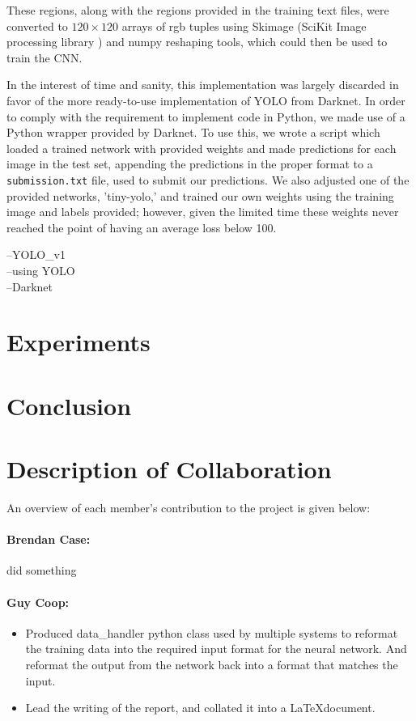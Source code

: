 \documentclass[10pt]{article}
\begin{document}
These regions, along with the regions provided in the training text files, were converted to $120\times 120$ arrays of rgb tuples using Skimage (SciKit Image processing library \cite{skimage}) and numpy reshaping tools, which could then be used to train the CNN.

In the interest of time and sanity, this implementation was largely discarded in favor of the more ready-to-use implementation of YOLO from Darknet. In order to comply with the requirement to implement code in Python, we made use of a Python wrapper provided by Darknet. To use this, we wrote a script which loaded a trained network with provided weights and made predictions for each image in the test set, appending the predictions in the proper format to a \texttt{submission.txt} file, used to submit our predictions. We also adjusted one of the provided networks, 'tiny-yolo,' and trained our own weights using the training image and labels provided; however, given the limited time these weights never reached the point of having an average loss below 100.

--YOLO\_v1\cite{yolo_v1}\\
--using YOLO\cite{yolo_v2}\\
--Darknet\\

\section{Experiments}

\section{Conclusion}

\section{Description of Collaboration}
An overview of each member's contribution to the project is given below:
\paragraph{Brendan Case:}
did something

\paragraph{Guy Coop:}
\begin{itemize}
	\item Produced data\_handler python class used by multiple systems to reformat the training data into the required input format for the neural network. And reformat the output from the network back into a format that matches the input.
	\item Lead the writing of the report, and collated it into a \LaTeX document.
\end{itemize}
\end{document}
